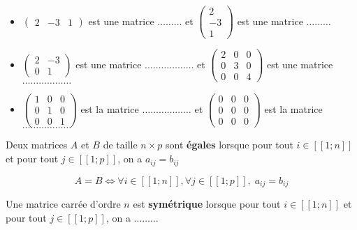 \documentclass[a4paper]{article}
\begin{document}
\bigskip
\begin{example}{}{}
	
\begin{itemize}[label=\textbullet]
	\item $\begin{pmatrix}
2 & -3 & 1 
\end{pmatrix}$ est une matrice $\ldots\ldots\ldots$ et $\begin{pmatrix}
2\\
-3 \\
1 
\end{pmatrix}$ est une matrice $\ldots\ldots\ldots$

	\item $\begin{pmatrix}
2 & -3 \\
0 & 1  
\end{pmatrix}$ est une matrice $\ldots\ldots\ldots\ldots\ldots\ldots$	et $\begin{pmatrix}
2 & 0 & 0 \\
0 & 3 & 0 \\
0 & 0 & 4 
\end{pmatrix}$ est une matrice $\ldots\ldots\ldots\ldots\ldots\ldots$
\item $\begin{pmatrix}
1 & 0 & 0 \\
0 & 1 & 0 \\
0 & 0 & 1
\end{pmatrix}$ est la matrice $\ldots\ldots\ldots\ldots\ldots\ldots$ et $\begin{pmatrix}
0 & 0 & 0 \\
0 & 0 & 0 \\
0 & 0 & 0
\end{pmatrix}$ est la matrice $\ldots\ldots\ldots\ldots\ldots\ldots$
\end{itemize}

\end{example}

\newpage

\begin{definition}{}{}
	Deux matrices $A$ et $B$ de taille $n\times p$ sont \textbf{égales} lorsque pour tout $i\in [\![1;n]\!]$ et pour tout $ j\in  [\![1;p]\!]$, on a $a_{ij}=b_{ij}$

$$A=B \iff \forall i\in [\![1;n]\!], \forall j\in  [\![1;p]\!], \; a_{ij}=b_{ij} $$ 
\end{definition}

\begin{definition}{}{}
	Une matrice carrée d'ordre $n$ est \textbf{symétrique} lorsque pour tout $i\in [\![1;n]\!]$ et pour tout $ j\in  [\![1;p]\!]$, on a $\ldots\ldots\ldots$
\end{definition}
\end{document}
